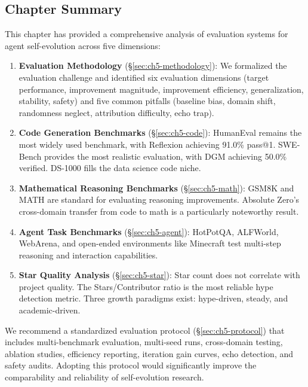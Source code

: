 \subsection{Chapter Summary}\label{sec:ch5-summary}

This chapter has provided a comprehensive analysis of evaluation systems for agent self-evolution across five dimensions:

\begin{enumerate}
\item \textbf{Evaluation Methodology} (\S\ref{sec:ch5-methodology}): We formalized the evaluation challenge and identified six evaluation dimensions (target performance, improvement magnitude, improvement efficiency, generalization, stability, safety) and five common pitfalls (baseline bias, domain shift, randomness neglect, attribution difficulty, echo trap).

\item \textbf{Code Generation Benchmarks} (\S\ref{sec:ch5-code}): HumanEval remains the most widely used benchmark, with Reflexion achieving 91.0\% pass@1. SWE-Bench provides the most realistic evaluation, with DGM achieving 50.0\% verified. DS-1000 fills the data science code niche.

\item \textbf{Mathematical Reasoning Benchmarks} (\S\ref{sec:ch5-math}): GSM8K and MATH are standard for evaluating reasoning improvements. Absolute Zero's cross-domain transfer from code to math is a particularly noteworthy result.

\item \textbf{Agent Task Benchmarks} (\S\ref{sec:ch5-agent}): HotPotQA, ALFWorld, WebArena, and open-ended environments like Minecraft test multi-step reasoning and interaction capabilities.

\item \textbf{Star Quality Analysis} (\S\ref{sec:ch5-star}): Star count does not correlate with project quality. The Stars/Contributor ratio is the most reliable hype detection metric. Three growth paradigms exist: hype-driven, steady, and academic-driven.
\end{enumerate}

We recommend a standardized evaluation protocol (\S\ref{sec:ch5-protocol}) that includes multi-benchmark evaluation, multi-seed runs, cross-domain testing, ablation studies, efficiency reporting, iteration gain curves, echo detection, and safety audits. Adopting this protocol would significantly improve the comparability and reliability of self-evolution research.

